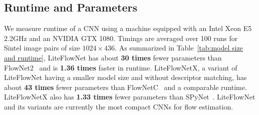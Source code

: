 \documentclass[10pt,twocolumn,letterpaper]{article}
\begin{document}
\subsection{Runtime and Parameters}
\label{sec:runtime}
\begin{table}[t]
\small
\centering
\caption{Number of training parameters and runtime. The model for which the runtime is in parentheses is measured using Torch, and hence are not directly comparable to the others using Caffe. Abbreviation LFlowNet refers to LiteFlowNet.} \label{tab:model size and runtime}
\end{table}
%
We measure runtime of a CNN using a machine equipped with an Intel Xeon E5 2.2GHz and an NVIDIA GTX 1080. Timings are averaged over 100 runs for Sintel image pairs of size $1024\times436$. As summarized in Table~\ref{tab:model size and runtime}, LiteFlowNet has about \textbf{30 times} fewer parameters than FlowNet2~\cite{Ilg17} and is \textbf{1.36 times} faster in runtime. LiteFlowNetX, a variant of LiteFlowNet having a smaller model size and without descriptor matching, has about \textbf{43 times} fewer parameters than FlowNetC~\cite{Fischer15} and a comparable runtime. LiteFlowNetX also has \textbf{1.33 times} fewer parameters than SPyNet~\cite{Ranjan17}. LiteFlowNet and its variants are currently the most compact CNNs for flow estimation.
%
\end{document}
